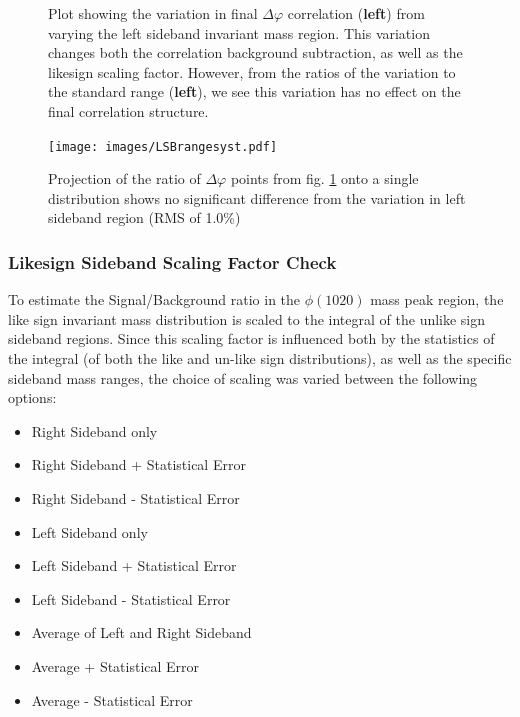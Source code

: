 \documentclass[ALICE,manyauthors]{ALICE_analysis_notes}
\begin{document}
\begin{figure}[ht]
\centering
\begin{subfigure}{
\texttt{[image: images/LSBrangedphi.pdf]}}
\end{subfigure}
\begin{subfigure}{
\texttt{[image: images/LSBrangeratio.pdf]}}
\end{subfigure}
\caption{Plot showing the variation in final $\Delta\varphi$ correlation (\textbf{left}) from varying the left sideband invariant mass region.  This variation changes both the correlation background subtraction, as well as the likesign scaling factor. However, from the ratios of the variation to the standard range (\textbf{left}), we see this variation has no effect on the final correlation structure.}
\label{LSBcheck}
\end{figure}

\begin{figure}[ht]
\centering
\texttt{[image: images/LSBrangesyst.pdf]}
\caption{Projection of the ratio of $\Delta\varphi$ points from fig. \ref{LSBcheck} onto a single distribution shows no significant difference from the variation in left sideband region (RMS of 1.0\%)}
\label{LSBRMS}
\end{figure}

\subsubsection{Likesign Sideband Scaling Factor Check}

To estimate the Signal/Background ratio in the $\phi(1020)$ mass peak region, the like sign invariant mass distribution is scaled to the integral of the unlike sign sideband regions. Since this scaling factor is influenced both by the statistics of the integral (of both the like and un-like sign distributions), as well as the specific sideband mass ranges, the choice of scaling was varied between the following options:

\begin{itemize}
    \item Right Sideband only
    \item Right Sideband + Statistical Error
    \item Right Sideband - Statistical Error
    \item Left Sideband only
    \item Left Sideband + Statistical Error
    \item Left Sideband - Statistical Error
    \item Average of Left and Right Sideband
    \item Average + Statistical Error
    \item Average - Statistical Error
\end{itemize}
\end{document}
